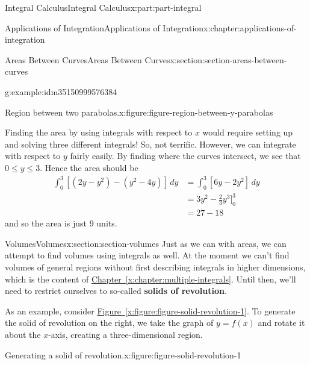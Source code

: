 \documentclass[twoside,10pt,]{book}
\newcommand{\xreffont}{\relax}
\newcommand{\terminology}[1]{\textbf{#1}}
\numberwithin{equation}{part}
\newcommand{\amp}{&}
\begin{document}
\begin{partptx}{Integral Calculus}{}{Integral Calculus}{}{}{x:part:part-integral}
\begin{chapterptx}{Applications of Integration}{}{Applications of Integration}{}{}{x:chapter:applications-of-integration}
\begin{sectionptx}{Areas Between Curves}{}{Areas Between Curves}{}{}{x:section:section-areas-between-curves}
\begin{example}{}{g:example:idm35150999576384}
\begin{figureptx}{Region between two parabolas.}{x:figure:figure-region-between-y-parabolas}{}
\begin{image}{0}{1}{0}
{
}%
\end{image}%
\tcblower
\end{figureptx}%
Finding the area by using integrals with respect to \(x\) would require setting up and solving three different integrals! So, not terrific. However, we can integrate with respect to \(y\) fairly easily. By finding where the curves intersect, we see that \(0\leq y\leq 3\). Hence the area should be%
\begin{align*}
\int_{0}^{3}[(2y - y^{2}) - (y^{2} - 4y)]\,dy \amp = \int_{0}^{3}[6y - 2y^{2}]\,dy \\
\amp = 3y^{2} - \frac{2}{3}y^{3}\Bigg]_{0}^{3} \\
\amp = 27 - 18 
\end{align*}
and so the area is just \(9\) units.%
\end{example}
\end{sectionptx}
%
%
\typeout{************************************************}
\typeout{************************************************}
%
\begin{sectionptx}{Volumes}{}{Volumes}{}{}{x:section:section-volumes}
Just as we can with areas, we can attempt to find volumes using integrals as well. At the moment we can't find volumes of general regions without first describing integrals in higher dimensions, which is the content of \hyperref[x:chapter:multiple-integrals]{Chapter~{\xreffont\ref{x:chapter:multiple-integrals}}}. Until then, we'll need to restrict ourselves to so-called \terminology{solids of revolution}.%
\par
As an example, consider \hyperref[x:figure:figure-solid-revolution-1]{Figure~{\xreffont\ref{x:figure:figure-solid-revolution-1}}}. To generate the solid of revolution on the right, we take the graph of \(y = f(x)\) and rotate it about the \(x\)-axis, creating a three-dimensional region.%
\begin{figureptx}{Generating a solid of revolution.}{x:figure:figure-solid-revolution-1}{}%
\begin{sidebyside}{2}{0}{0}{0}%
\begin{sbspanel}{0.5}%
\resizebox{\linewidth}{!}{%
}
\end{sbspanel}
\end{sidebyside}
\end{figureptx}
\end{sectionptx}
\end{chapterptx}
\end{partptx}
\end{document}
